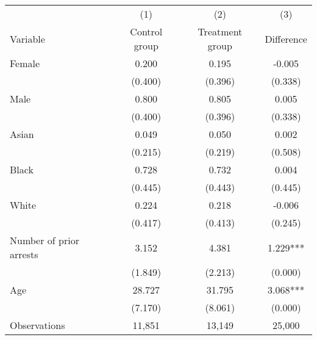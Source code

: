 \begin{tabular}{l*{3}c}
\toprule
 & (1) & (2) & (3) \\
Variable & Control group & Treatment group & Difference \\
\midrule
Female&0.200&0.195&-0.005\\
&(0.400)&(0.396)&(0.338)\\
Male&0.800&0.805&0.005\\
&(0.400)&(0.396)&(0.338)\\
Asian&0.049&0.050&0.002\\
&(0.215)&(0.219)&(0.508)\\
Black&0.728&0.732&0.004\\
&(0.445)&(0.443)&(0.445)\\
White&0.224&0.218&-0.006\\
&(0.417)&(0.413)&(0.245)\\
Number of prior arrests&3.152&4.381&1.229***\\
&(1.849)&(2.213)&(0.000)\\
Age&28.727&31.795&3.068***\\
&(7.170)&(8.061)&(0.000)\\
\midrule
Observations & 11,851 & 13,149 & 25,000 \\
\bottomrule
\end{tabular}
